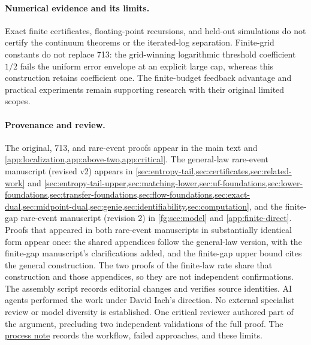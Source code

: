 \paragraph{Numerical evidence and its limits.}
Exact finite certificates, floating-point recursions, and held-out
simulations do not certify the continuum theorems or the iterated-log
separation. Finite-grid constants do not replace 713: the grid-winning
logarithmic threshold coefficient $1/2$ fails the uniform error envelope
at an explicit large cap, whereas this construction retains coefficient
one. The finite-budget feedback advantage and practical experiments
remain supporting research with their original limited scopes.

\paragraph{Provenance and review.}
The original, 713, and rare-event proofs appear in the main text and
\cref{app:localization,app:above-two,app:critical}. The
general-law rare-event manuscript (revised v2) appears in
\cref{sec:entropy-tail,sec:certificates,sec:related-work} and
\cref{sec:entropy-tail-upper,sec:matching-lower,sec:uf-foundations,sec:lower-foundations,sec:transfer-foundations,sec:flow-foundations,sec:exact-dual,sec:midpoint-dual,sec:genie,sec:identifiability,sec:computation},
and the finite-gap rare-event manuscript (revision 2) in
\cref{fg:sec:model} and \cref{app:finite-direct}. Proofs that appeared
in both rare-event manuscripts in substantially identical form appear
once: the shared appendices follow the general-law version, with the
finite-gap manuscript's clarifications added, and the finite-gap upper
bound cites the general construction. The two proofs of the finite-law
rate share that construction and those appendices, so they are not
independent confirmations.
The assembly script records editorial changes and verifies source identities.
AI agents performed the work under David Iach's direction. No external
specialist review or model diversity is established. One critical
reviewer authored part of the argument, precluding two independent
validations of the full proof. The
\href{https://github.com/davidiach/adaptive-threshold-estimation/blob/6009662a5581b31de17c8956b6fd93e4279ba087/docs/process/METHOD.md}{process note}
records the workflow, failed approaches, and these limits.

